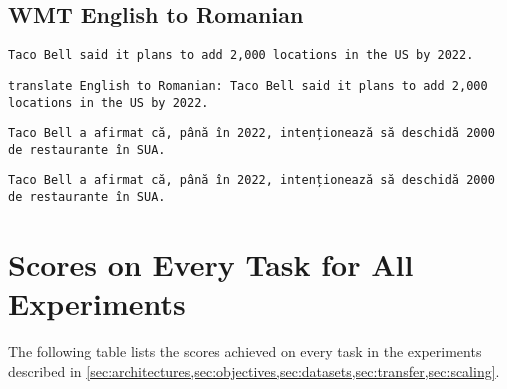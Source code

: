 \documentclass[twoside,11pt]{article}
\begin{document}
\subsection{WMT English to Romanian}
\begin{description}[leftmargin=0.5cm]
\item[Original input:] \texttt{Taco Bell said it plans to add 2,000 locations in the US by 2022.}
\item[Processed input:] \texttt{translate English to Romanian:\ Taco Bell said it plans to add 2,000 locations in the US by 2022.}
\item[Original target:] \texttt{Taco Bell a afirmat că, până în 2022, intenționează să deschidă 2000 de restaurante în SUA.}
\item[Processed target:] \texttt{Taco Bell a afirmat că, până în 2022, intenționează să deschidă 2000 de restaurante în SUA.}
\end{description}




\clearpage


\section{Scores on Every Task for All Experiments}
\label{sec:giant}

The following table lists the scores achieved on every task in the experiments described in \cref{sec:architectures,sec:objectives,sec:datasets,sec:transfer,sec:scaling}.

\clearpage
\eject \pdfpagewidth=58cm \pdfpageheight=39cm
\thispagestyle{empty}
\end{document}
